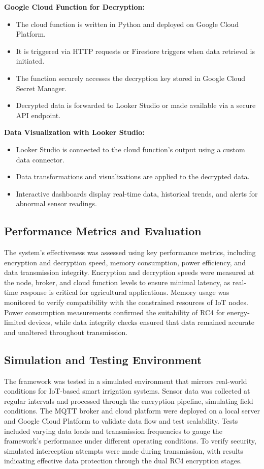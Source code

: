 \documentclass[conference]{IEEEtran}
\begin{document}
\textbf{Google Cloud Function for Decryption:}
\begin{itemize}
    \item The cloud function is written in Python and deployed on Google Cloud Platform.
    \item It is triggered via HTTP requests or Firestore triggers when data retrieval is initiated.
    \item The function securely accesses the decryption key stored in Google Cloud Secret Manager.
    \item Decrypted data is forwarded to Looker Studio or made available via a secure API endpoint.
\end{itemize}

\textbf{Data Visualization with Looker Studio:}
\begin{itemize}
    \item Looker Studio is connected to the cloud function's output using a custom data connector.
    \item Data transformations and visualizations are applied to the decrypted data.
    \item Interactive dashboards display real-time data, historical trends, and alerts for abnormal sensor readings.
\end{itemize}

\subsection{Performance Metrics and Evaluation}
The system's effectiveness was assessed using key performance metrics, including encryption and decryption speed, memory consumption, power efficiency, and data transmission integrity. Encryption and decryption speeds were measured at the node, broker, and cloud function levels to ensure minimal latency, as real-time response is critical for agricultural applications. Memory usage was monitored to verify compatibility with the constrained resources of IoT nodes. Power consumption measurements confirmed the suitability of RC4 for energy-limited devices, while data integrity checks ensured that data remained accurate and unaltered throughout transmission.

\subsection{Simulation and Testing Environment}
The framework was tested in a simulated environment that mirrors real-world conditions for IoT-based smart irrigation systems. Sensor data was collected at regular intervals and processed through the encryption pipeline, simulating field conditions. The MQTT broker and cloud platform were deployed on a local server and Google Cloud Platform to validate data flow and test scalability. Tests included varying data loads and transmission frequencies to gauge the framework's performance under different operating conditions. To verify security, simulated interception attempts were made during transmission, with results indicating effective data protection through the dual RC4 encryption stages.
\end{document}
